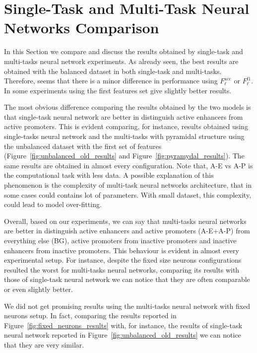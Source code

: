 \section{Single-Task and Multi-Task Neural Networks Comparison}
\label{sec:results_discussion}
In this Section we compare and discuss the results obtained by single-task and multi-tasks neural network experiments. As already seen, the best results are obtained with the balanced dataset in both single-task and multi-tasks. Therefore, seems that there is a minor difference in performance using $F_\ell^{\textrm{acc}}$ or $F_\ell^{\textrm{f1}}$. In some experiments using the first features set give slightly better results. 

The most obvious difference comparing the results obtained by the two models is that single-task neural network are better in distinguish active enhancers from active promoters. This is evident comparing, for instance, results obtained using single-tasks neural network and the multi-tasks with pyramidal structure using the unbalanced dataset with the first set of features (Figure~\ref{fig:unbalanced_old_results} and Figure~\ref{fig:pyramydal_results}). The same results are obtained in almost every configuration. Note that, A-E vs A-P is the computational task with less data. A possible explanation of this phenomenon is the complexity of multi-task neural networks architecture, that in some cases could contains lot of parameters. With small dataset, this complexity, could lead to model over-fitting. 

Overall, based on our experiments, we can say that multi-tasks neural networks are better in distinguish active enhancers and active promoters (A-E+A-P) from everything else (BG), active promoters from inactive promoters and inactive enhancers from inactive promoters. This behaviour is evident in almost every experimental setup. For instance, despite the fixed size neurons configurations resulted the worst for multi-tasks neural networks, comparing its results with those of single-task neural network we can notice that they are often comparable or even slightly better.

We did not get promising results using the multi-tasks neural network with fixed neurons setup. In fact, comparing the results reported in Figure~\ref{fig:fixed_neurons_results} with, for instance, the results of single-task neural network reported in Figure~\ref{fig:unbalanced_old_results} we can notice that they are very similar.

